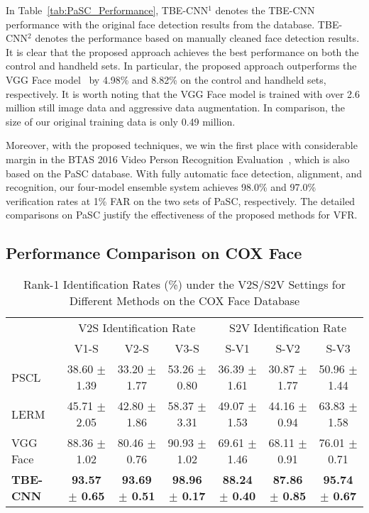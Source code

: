 \documentclass[10pt,journal,cspaper,compsoc]{IEEEtran}
\begin{document}
In Table~\ref{tab:PaSC_Performance}, TBE-CNN$^1$ denotes the TBE-CNN performance with the original face detection results from the database.
TBE-CNN$^2$ denotes the performance based on manually cleaned face detection results.
It is clear that the proposed approach achieves the best performance on both the control and handheld sets.
In particular, the proposed approach outperforms the VGG Face model~\cite{parkhi2015deep} by 4.98\% and 8.82\% on the control and handheld sets, respectively.
It is worth noting that the VGG Face model is trained with over 2.6 million still image data and aggressive data augmentation.
In comparison, the size of our original training data is only 0.49 million.

Moreover, with the proposed techniques, we win the first place with considerable margin in the BTAS 2016 Video Person Recognition Evaluation~\cite{phillips2016report},
which is also based on the PaSC database.
With fully automatic face detection, alignment, and recognition, our four-model ensemble system achieves 98.0\% and 97.0\% verification rates at 1\% FAR on the two sets of PaSC, respectively.
The detailed comparisons on PaSC justify the effectiveness of the proposed methods for VFR.


\subsection{Performance Comparison on COX Face}
\label{sec:cox}

\begin{table*}[!t]
\renewcommand{\arraystretch}{1.3}
\caption{Rank-1 Identification Rates (\%) under the V2S/S2V Settings for Different Methods on the COX Face Database}
\label{tab:COXFace_S2V}
\centering
\begin{tabular}{|l|c|c|c||c|c|c|}
\hline
\multirow{2}{*}{}  \multirow{2}{*}{} &
\multicolumn{3}{c||}{V2S Identification Rate} &
\multicolumn{3}{c|}{S2V Identification Rate} \\
\cline{2-7}
& V1-S & V2-S & V3-S & S-V1 & S-V2 & S-V3 \\
\hline\hline
PSCL~\cite{Huang2015Benchmark}    &38.60 $\pm$ 1.39   &33.20 $\pm$ 1.77   &53.26 $\pm$ 0.80   &36.39 $\pm$ 1.61   &30.87 $\pm$ 1.77    &50.96 $\pm$ 1.44 \\\hline
LERM~\cite{huang2014learning}     &45.71 $\pm$ 2.05   &42.80 $\pm$ 1.86   &58.37 $\pm$ 3.31   &49.07 $\pm$ 1.53   &44.16 $\pm$ 0.94    &63.83 $\pm$ 1.58 \\\hline
VGG Face~\cite{parkhi2015deep}    &88.36 $\pm$ 1.02   &80.46 $\pm$ 0.76   &90.93 $\pm$ 1.02   &69.61 $\pm$ 1.46   &68.11 $\pm$ 0.91    &76.01 $\pm$ 0.71 \\\hline
\textbf{TBE-CNN}                  &\textbf{93.57 $\pm$ 0.65}   &\textbf{93.69 $\pm$ 0.51}   &\textbf{98.96 $\pm$ 0.17}  &\textbf{88.24 $\pm$ 0.40}   &\textbf{87.86 $\pm$ 0.85}    &\textbf{95.74 $\pm$ 0.67} \\\hline
\end{tabular}
\end{table*}
\end{document}
